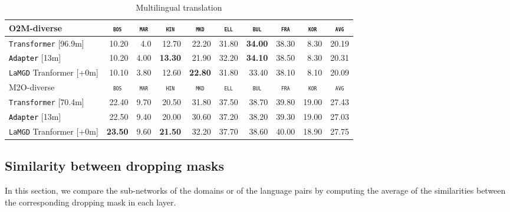 \documentclass[11pt]{article}
\newcommand{\revision}[1]{\textcolor{black}{#1}}
\newcommand{\domain}[1]{\texttt{\textsc{#1}}}
\newcommand{\system}[1]{\texttt{{#1}}}
\newcommand{\SB}[1]{\textbf{#1}}
\begin{document}
\begin{table}[h!]
\begin{tabular}{|p{4cm}|*{9}{r|}}
    \hline
    \hline
    O2M-diverse & \multicolumn{1}{c|}{\domain{bos}} & \multicolumn{1}{c|}{\domain{mar}} & \multicolumn{1}{c|}{\domain{hin}} & \multicolumn{1}{c|}{\domain{mkd}} & \multicolumn{1}{c|}{\domain{ell}} & \multicolumn{1}{c|}{\domain{bul}} & \multicolumn{1}{c|}{\domain{fra}} & \multicolumn{1}{c|}{\domain{kor}} & \multicolumn{1}{c|}{\domain{avg}} \\ \hline 
    \system{Transformer}  \hfill{\footnotesize[96.9m]} & 10.20&4.0&12.70&22.20&31.80&\SB{34.00}&38.30&8.30&20.19 \\
    \revision{\system{Adapter}}   \hfill{\footnotesize[13m]}  &10.20&4.00&\SB{13.30}&21.90&32.20&\SB{34.10}&38.50&8.30&20.31 \\ 
    \system{LaMGD} Tranformer   \hfill{\footnotesize[+0m]}&10.10&3.80&12.60&\SB{22.80}&31.80&33.40&38.10&8.10&20.09\\
    \hline 
    \hline
    M2O-diverse & \multicolumn{1}{c|}{\domain{bos}} & \multicolumn{1}{c|}{\domain{mar}} & \multicolumn{1}{c|}{\domain{hin}} & \multicolumn{1}{c|}{\domain{mkd}} & \multicolumn{1}{c|}{\domain{ell}} & \multicolumn{1}{c|}{\domain{bul}} & \multicolumn{1}{c|}{\domain{fra}} & \multicolumn{1}{c|}{\domain{kor}} & \multicolumn{1}{c|}{\domain{avg}} \\ \hline 
    \system{Transformer}  \hfill{\footnotesize[70.4m]} &22.40&9.70&20.50&31.80&37.50&38.70&39.80&19.00&27.43 \\
    \revision{\system{Adapter}}   \hfill{\footnotesize[13m]}  &22.50&9.40&20.00&30.60&37.20&38.20&39.30&19.00&27.03\\ 
    \system{LaMGD} Tranformer   \hfill{\footnotesize[+0m]} &\SB{23.50}&9.60&\SB{21.50}&32.20&37.70&38.60&40.00&18.90&27.75 \\
    \hline
  \end{tabular}
  \caption{Multilingual translation}
  \label{tab:multilingual}
\end{table}


\subsection{Similarity between dropping masks}
\label{ssec:abalation}
In this section, we compare the sub-networks of the domains or of the language pairs by computing the average of the similarities between the corresponding dropping mask in each layer.
\end{document}
